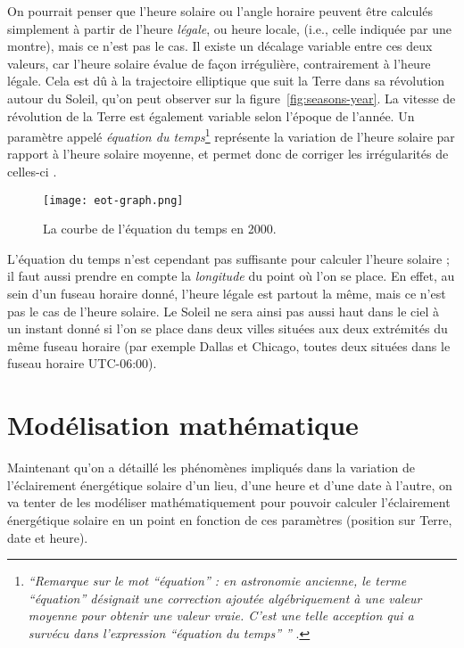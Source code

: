 \documentclass[12pt]{article}
\begin{document}
On pourrait penser que l'heure solaire ou l'angle horaire peuvent être calculés simplement à partir de l'heure \emph{légale}, ou heure locale, (i.e., celle indiquée par une montre), mais ce n'est pas le cas.
Il existe un décalage variable entre ces deux valeurs, car l'heure solaire évalue de façon irrégulière, contrairement à l'heure légale.
Cela est dû à la trajectoire elliptique que suit la Terre dans sa révolution autour du Soleil, qu'on peut observer sur la figure~\ref{fig:seasons-year}.
La vitesse de révolution de la Terre est également variable selon l'époque de l'année.
Un paramètre appelé \emph{équation du temps}\footnote{\textit{``Remarque sur le mot ``équation'' : en astronomie ancienne, le terme ``équation'' désignait une correction ajoutée algébriquement à une valeur moyenne pour obtenir une valeur vraie.
C'est une telle acception qui a survécu dans l'expression ``équation du temps'' ''} \cite{equation_temps_wiki}.} représente la variation de l'heure solaire par rapport à l'heure solaire moyenne, et permet donc de corriger les irrégularités de celles-ci \cite{equation_temps_wiki}.

 \begin{figure}[H]
	\centerline{\texttt{[image: eot-graph.png]}}
	\caption{
		La courbe de l'équation du temps en 2000.
	}
	\label{fig:eot-graph}
\end{figure}

L'équation du temps n'est cependant pas suffisante pour calculer l'heure solaire ; il faut aussi prendre en compte la \emph{longitude} du point où l'on se place.
En effet, au sein d'un fuseau horaire donné, l'heure légale est partout la même, mais ce n'est pas le cas de l'heure solaire.
Le Soleil ne sera ainsi pas aussi haut dans le ciel à un instant donné si l'on se place dans deux villes situées aux deux extrémités du même fuseau horaire (par exemple Dallas et Chicago, toutes deux situées dans le fuseau horaire UTC-06:00).



\clearpage
\section{Modélisation mathématique}

Maintenant qu'on a détaillé les phénomènes impliqués dans la variation de l'éclairement énergétique solaire d'un lieu, d'une heure et d'une date à l'autre, on va tenter de les modéliser mathématiquement pour pouvoir calculer l'éclairement énergétique solaire en un point en fonction de ces paramètres (position sur Terre, date et heure).
\end{document}
